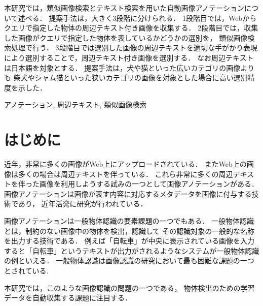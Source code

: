 \documentclass{deimj}
\begin{document}
\pagestyle{empty}
\begin{jabstract}
本研究では，類似画像検索とテキスト検索を用いた自動画像アノテーションについて述べる．
提案手法は，大きく3段階に分けられる．
1段階目では，Webからクエリで指定した物体の周辺テキスト付き画像を収集する．
2段階目では，収集した画像がクエリで指定した物体を表しているかどうかの選別を，
類似画像検索処理で行う．
3段階目では選別した画像の周辺テキストを適切な手がかり表現により選別することで，周辺テキスト付き画像を選別する．
なお周辺テキストは日本語を対象とする．
提案手法は，犬や猫といった広いカテゴリの画像よりも
柴犬やシャム猫といった狭いカテゴリの画像を対象とした場合に高い選別精度を示した．

\end{jabstract}
\begin{jkeyword}
アノテーション, 周辺テキスト, 類似画像検索
\end{jkeyword}
\maketitle

\section{はじめに}
\label{sec:intro}
近年，非常に多くの画像がWeb上にアップロードされている．
またWeb上の画像は多くの場合は周辺テキストを伴っている．
これら非常に多くの周辺テキストを伴った画像を利用しようする試みの一つとして画像アノテーションがある．
画像アノテーションは画像が表す内容に対応するメタデータを画像に付与する技術であり，
近年活発に研究が行われている\cite{jeon,watanabe}．

画像アノテーションは一般物体認識の要素課題の一つでもある．
一般物体認識とは，制約のない画像中の物体を検出，認識して
その認識対象の一般的な名称を出力する技術である．
例えば「自転車」が中央に表示されている画像を入力すると「自転車」というテキストが出力がされるようなシステムが一般物体認識の例といえる．
一般物体認識は画像認識の研究において最も困難な課題の一つとされている\cite{yanai}.

%
本研究では，このような画像認識の問題の一つである，
物体検出のための学習データを自動収集する課題に注目する．
\end{document}
